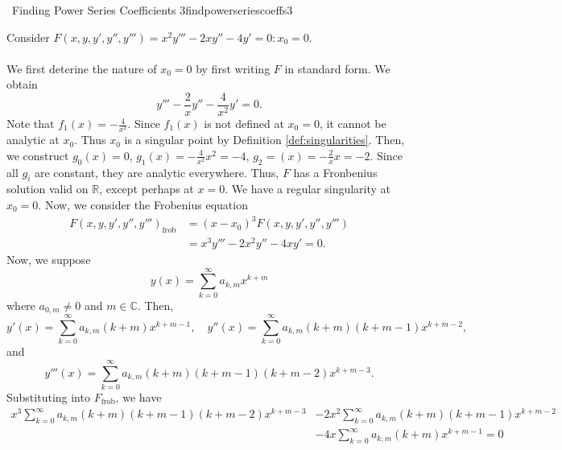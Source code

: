         \begin{example}{\Difficulty\,\Difficulty\,\,Finding Power Series Coefficients 3}{findpowerseriescoeffs3}
            
            Consider \(F(x,y,y',y'',y''')=x^2y'''-2xy''-4y'=0:x_0=0\).
            \\
            \\
            We first deterine the nature of \(x_0=0\) by first writing \(F\) in standard form. We obtain
            \begin{equation*}
                y'''-\frac{2}{x}y''-\frac{4}{x^2}y'=0.
            \end{equation*}
            Note that \(f_1(x)=-\frac{4}{x^2}\). Since \(f_1(x)\) is not defined at \(x_0=0\), it cannot be analytic at \(x_0\). Thus \(x_0\) is a singular point by Definition \ref{def:singularities}. Then, we construct \(g_0(x)=0\), \(g_1(x)=-\frac{4}{x^2}x^2=-4\), \(g_2=(x)=-\frac{2}{x}x=-2\). Since all \(g_i\) are constant, they are analytic everywhere. Thus, \(F\) has a Fronbenius solution valid on \(\mathbb{R}\), except perhaps at \(x=0\). We have a regular singularity at \(x_0=0\). Now, we consider the Frobenius equation
            \begin{align*}
                F(x,y,y',y'',y''')_{\text{frob}}&=(x-x_0)^3F(x,y,y',y'',y''') \\
                &=x^3y'''-2x^2y''-4xy'=0.
            \end{align*}
            Now, we suppose
            \begin{equation*}
                y(x)=\sum_{k=0}^\infty a_{k,m}x^{k+m}
            \end{equation*}
            where \(a_{0,m}\neq0\) and \(m\in\mathbb{C}\). Then,
            \begin{equation*}
                y'(x)=\sum_{k=0}^\infty a_{k,m}(k+m)x^{k+m-1},\quad y''(x)=\sum_{k=0}^\infty a_{k,m}(k+m)(k+m-1)x^{k+m-2},
            \end{equation*}
            and
            \begin{equation*}
                y'''(x)=\sum_{k=0}^\infty a_{k,m}(k+m)(k+m-1)(k+m-2)x^{k+m-3}.
            \end{equation*}
            Substituting into \(F_{\text{frob}}\), we have
            \begin{align*}
                x^3\sum_{k=0}^\infty a_{k,m}(k+m)(k+m-1)(k+m-2)x^{k+m-3}&-2x^2\sum_{k=0}^\infty a_{k,m}(k+m)(k+m-1)x^{k+m-2}\\
                &-4x\sum_{k=0}^\infty a_{k,m}(k+m)x^{k+m-1}=0

\end{align*}
\end{example}
